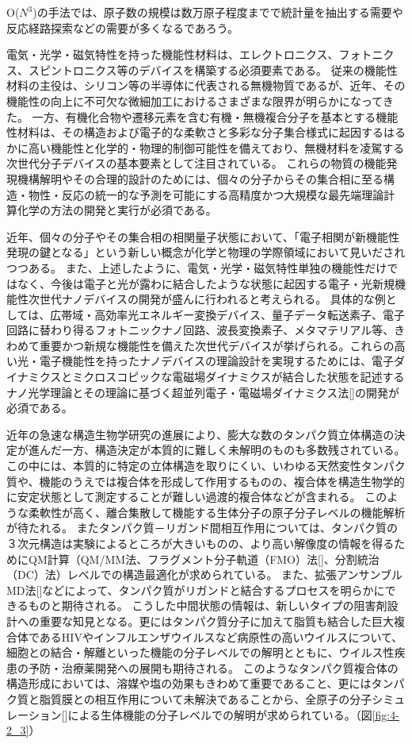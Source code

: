 O($N^3$)の手法では、原子数の規模は数万原子程度までで統計量を抽出する需要や反応経路探索などの需要が多くなるであろう。

電気・光学・磁気特性を持った機能性材料は、エレクトロニクス、フォトニクス、スピントロニクス等のデバイスを構築する必須要素である。
従来の機能性材料の主役は、シリコン等の半導体に代表される無機物質であるが、近年、その機能性の向上に不可欠な微細加工におけるさまざまな限界が明らかになってきた。
一方、有機化合物や遷移元素を含む有機・無機複合分子を基本とする機能性材料は、その構造および電子的な柔軟さと多彩な分子集合様式に起因するはるかに高い機能性と化学的・物理的制御可能性を備えており、無機材料を凌駕する次世代分子デバイスの基本要素として注目されている。
これらの物質の機能発現機構解明やその合理的設計のためには、個々の分子からその集合相に至る構造・物性・反応の統一的な予測を可能にする高精度かつ大規模な最先端理論計算化学の方法の開発と実行が必須である。

近年、個々の分子やその集合相の相関量子状態において、「電子相関が新機能性発現の鍵となる」という新しい概念が化学と物理の学際領域において見いだされつつある。
また、上述したように、電気・光学・磁気特性単独の機能性だけではなく、今後は電子と光が露わに結合したような状態に起因する電子・光新規機能性次世代ナノデバイスの開発が盛んに行われると考えられる。
具体的な例としては、広帯域・高効率光エネルギー変換デバイス、量子データ転送素子、電子回路に替わり得るフォトニックナノ回路、波長変換素子、メタマテリアル等、きわめて重要かつ新規な機能性を備えた次世代デバイスが挙げられる。これらの高い光・電子機能性を持ったナノデバイスの理論設計を実現するためには、電子ダイナミクスとミクロスコピックな電磁場ダイナミクスが結合した状態を記述するナノ光学理論とその理論に基づく超並列電子・電磁場ダイナミクス法[]の開発が必須である。

近年の急速な構造生物学研究の進展により、膨大な数のタンパク質立体構造の決定が進んだ一方、構造決定が本質的に難しく未解明のものも多数残されている。
この中には、本質的に特定の立体構造を取りにくい、いわゆる天然変性タンパク質や、機能のうえでは複合体を形成して作用するものの、複合体を構造生物学的に安定状態として測定することが難しい過渡的複合体などが含まれる。
このような柔軟性が高く、離合集散して機能する生体分子の原子分子レベルの機能解析が待たれる。
またタンパク質－リガンド間相互作用については、タンパク質の３次元構造は実験によるところが大きいものの、より高い解像度の情報を得るためにQM計算（QM/MM法、フラグメント分子軌道（FMO）法[]、分割統治（DC）法）レベルでの構造最適化が求められている。
また、拡張アンサンブルMD法[]などによって、タンパク質がリガンドと結合するプロセスを明らかにできるものと期待される。
こうした中間状態の情報は、新しいタイプの阻害剤設計への重要な知見となる。更にはタンパク質分子に加えて脂質も結合した巨大複合体であるHIVやインフルエンザウイルスなど病原性の高いウイルスについて、細胞との結合・解離といった機能の分子レベルでの解明とともに、ウイルス性疾患の予防・治療薬開発への展開も期待される。
このようなタンパク質複合体の構造形成においては、溶媒や塩の効果もきわめて重要であること、更にはタンパク質と脂質膜との相互作用について未解決であることから、全原子の分子シミュレーション[]による生体機能の分子レベルでの解明が求められている。（図\ref{fig:4-2_3}）

